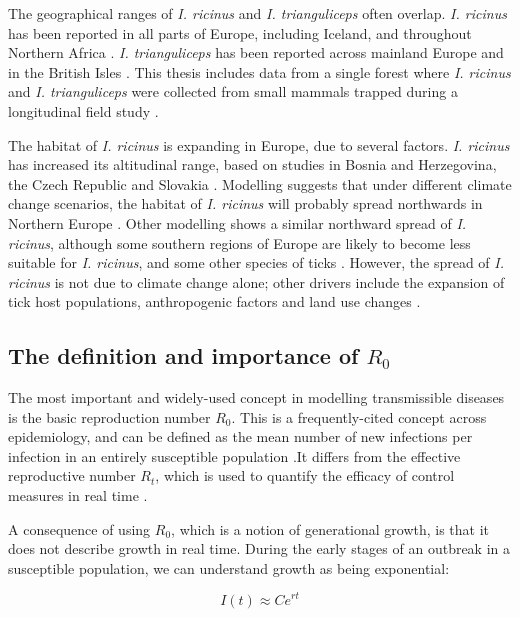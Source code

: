 \documentclass{article}
\begin{document}
The geographical ranges of \textit{I. ricinus} and \textit{I. trianguliceps} often overlap. \textit{I. ricinus} has been reported in all parts of Europe, including Iceland, and throughout Northern Africa \cite{Otranto_2017}. \textit{I. trianguliceps} has been reported across mainland Europe and in the British Isles \cite{Pf_ffle_2017}. This thesis includes data from a single forest where \textit{I. ricinus} and \textit{I. trianguliceps} were collected from small mammals trapped during a longitudinal field study \cite{Bown2008, Bown2011}.

The habitat of \textit{I. ricinus} is expanding in Europe, due to several factors. \textit{I. ricinus} has increased its altitudinal range, based on studies in Bosnia and Herzegovina, the Czech Republic and Slovakia \cite{Medlock2013}. Modelling suggests that under different climate change scenarios, the habitat of \textit{I. ricinus} will probably spread northwards in Northern Europe \cite{Alkishe_2017}. Other modelling shows a similar northward spread of \textit{I. ricinus}, although some southern regions of Europe are likely to become less suitable for \textit{I. ricinus}, and some other species of ticks \cite{Cunze_2022}. However, the spread of \textit{I. ricinus} is not due to climate change alone; other drivers include the expansion of tick host populations, anthropogenic factors and land use changes \cite{Medlock2013}.

\subsection{The definition and importance of \texorpdfstring{$ R_0 $}{R0}}

The most important and widely-used concept in modelling transmissible diseases is the basic reproduction number $ R_0 $. This is a frequently-cited concept across epidemiology, and can be defined as the mean number of new infections per infection in an entirely susceptible population \cite{Diekman2000}.It differs from the effective reproductive number $ R_t $, which is used to quantify the efficacy of control measures in real time \cite{Lim2020}.

A consequence of using $ R_0 $, which is a notion of generational growth, is that it does not describe growth in real time. During the early stages of an outbreak in a susceptible population, we can understand growth as being exponential:

\begin{equation}
	I(t) \approx Ce^{rt} \nonumber
\end{equation}
\end{document}
